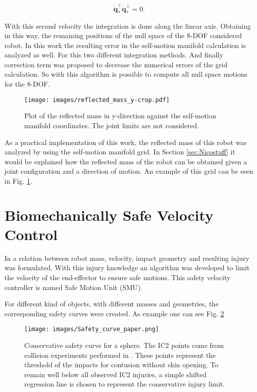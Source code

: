 \begin{equation}
\dot{\mathbf{q}}_*^\top\dot{\mathbf{q}}_*^{\bot}=0.
\label{eq:orthogonalVelocityVectors}
\end{equation}

With this second velocity the integration is done along the linear axis. Obtaining in this way, the remaining positions of the null space of the 8-DOF considered robot.
%
In this work the resulting error in the self-motion manifold calculation is analyzed as well. For this two different integration methods. And finally correction term was proposed to decrease the numerical errors of the grid calculation.  
%
So with this algorithm is possible to compute all null space motions for the 8-DOF. 


\begin{figure}[!htb]
	\centerline{
		\texttt{[image: images/reflected\_mass\_y-crop.pdf]}}
	\caption{Plot of the reflected mass in y-direction against the self-motion 		manifold coordinates. The joint limits are not considered.}
	\label{fig:reflected_mass_y-crop}
\end{figure}

As a practical implementation of this work, the reflected mass of this robot was analyzed by using the self-motion manifold grid. In Section \ref{sec:Nicostuff} it would be explained how the reflected mass of the robot can be obtained given a joint configuration and a direction of motion. 
An example of this grid can be seen in Fig.	\ref{fig:reflected_mass_y-crop}.


 

\section{Biomechanically Safe Velocity Control}
\label{sec:Samistuff}

In \cite{sammi_paper} a relation between robot mass, velocity, impact geometry
and resulting injury was formulated. With this injury knowledge an algorithm was developed to limit the velocity of the end-effector to ensure safe motions. This safety velocity controller  is named Safe Motion Unit (SMU). 

For different kind of objects, with different masses and geometries, the corresponding safety curves were created. As example one can see Fig. \ref{fig:Safety_curve_paper}


\begin{figure}[htb]
	\centerline{
		\texttt{[image: images/Safety\_curve\_paper.png]}}
	\caption{Conservative safety curve for a sphere. The IC2 points come from collision experiments performed in \cite{sammi_paper}. These points represent the threshold of the impacts for contusion without skin opening. To remain well below all observed IC2 injuries, a simple shifted regression line is chosen to represent the conservative injury limit.}
	\label{fig:Safety_curve_paper}
\end{figure}
 

